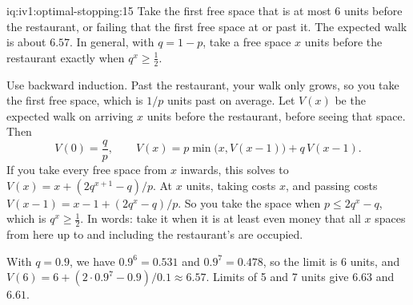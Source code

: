 \begin{solution}{iq:iv1:optimal-stopping:15}
Take the first free space that is at most 6 units before the restaurant, or failing that the first free space at or past it. The expected walk is about $6.57$. In general, with $q = 1 - p$, take a free space $x$ units before the restaurant exactly when $q^x \ge \tfrac12$.

Use backward induction. Past the restaurant, your walk only grows, so you take the first free space, which is $1/p$ units past on average. Let $V(x)$ be the expected walk on arriving $x$ units before the restaurant, before seeing that space. Then
\[
V(0) = \frac{q}{p}, \qquad V(x) = p\min\bigl(x, V(x - 1)\bigr) + q\,V(x - 1).
\]
If you take every free space from $x$ inwards, this solves to $V(x) = x + (2q^{x + 1} - q)/p$. At $x$ units, taking costs $x$, and passing costs $V(x - 1) = x - 1 + (2q^x - q)/p$. So you take the space when $p \le 2q^x - q$, which is $q^x \ge \tfrac12$. In words: take it when it is at least even money that all $x$ spaces from here up to and including the restaurant's are occupied.

With $q = 0.9$, we have $0.9^6 = 0.531$ and $0.9^7 = 0.478$, so the limit is 6 units, and $V(6) = 6 + (2 \cdot 0.9^7 - 0.9)/0.1 \approx 6.57$. Limits of 5 and 7 units give $6.63$ and $6.61$.

\end{solution}

